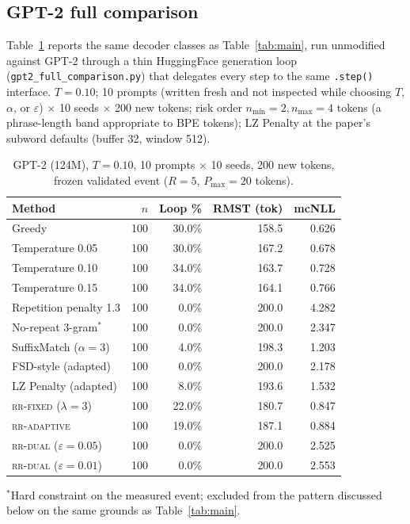 \subsection{GPT-2 full comparison}
\label{sec:gpt2-full}
Table~\ref{tab:gpt2full} reports the same decoder classes as Table~\ref{tab:main}, run unmodified against GPT-2 through a thin HuggingFace generation loop (\texttt{gpt2\_\allowbreak{}full\_\allowbreak{}comparison.py}) that delegates every step to the same \texttt{.step()} interface. $T{=}0.10$; 10 prompts (written fresh and not inspected while choosing $T$, $\alpha$, or $\varepsilon$) $\times$ 10 seeds $\times$ 200 new tokens; risk order $n_{\min}{=}2,n_{\max}{=}4$ tokens (a phrase-length band appropriate to BPE tokens); LZ Penalty at the paper's subword defaults (buffer 32, window 512).

\begin{table}[ht]
\centering
\caption{GPT-2 (124M), $T{=}0.10$, 10 prompts $\times$ 10 seeds, 200 new tokens, frozen validated event ($R{=}5$, $P_{\max}{=}20$ tokens).}
\label{tab:gpt2full}
\begin{tabular}{@{}lrrrr@{}}
\toprule
Method & $n$ & Loop \% & RMST (tok) & mcNLL \\
\midrule
Greedy                      & 100 & 30.0\% & 158.5 & 0.626 \\
Temperature 0.05             & 100 & 30.0\% & 167.2 & 0.678 \\
Temperature 0.10             & 100 & 34.0\% & 163.7 & 0.728 \\
Temperature 0.15             & 100 & 34.0\% & 164.1 & 0.766 \\
Repetition penalty 1.3        & 100 & 0.0\%  & 200.0 & 4.282 \\
No-repeat 3-gram$^{*}$       & 100 & 0.0\%  & 200.0 & 2.347 \\
SuffixMatch ($\alpha{=}3$)    & 100 & 4.0\%  & 198.3 & 1.203 \\
FSD-style (adapted)          & 100 & 0.0\%  & 200.0 & 2.178 \\
LZ Penalty (adapted)        & 100 & 8.0\%  & 193.6 & 1.532 \\
\textsc{rr-fixed} ($\lambda{=}3$)   & 100 & 22.0\% & 180.7 & 0.847 \\
\textsc{rr-adaptive}          & 100 & 19.0\% & 187.1 & 0.884 \\
\textsc{rr-dual} ($\varepsilon{=}0.05$) & 100 & 0.0\% & 200.0 & 2.525 \\
\textsc{rr-dual} ($\varepsilon{=}0.01$) & 100 & 0.0\% & 200.0 & 2.553 \\
\bottomrule
\end{tabular}

\vspace{4pt}
{\footnotesize $^{*}$Hard constraint on the measured event; excluded from the pattern discussed below on the same grounds as Table~\ref{tab:main}.}
\end{table}

